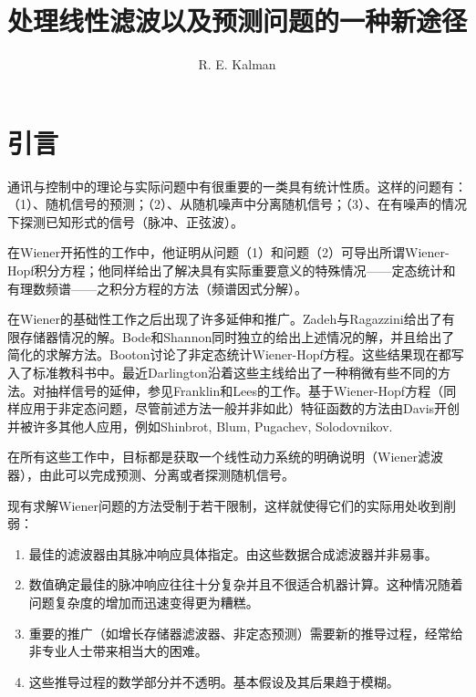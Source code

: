 \documentclass[UTF8,adobefonts]{ctexart}
\begin{document}
\title{处理线性滤波以及预测问题的一种新途径}
\author{R. E. Kalman}
\date{}
\maketitle
\section{引言}
通讯与控制中的理论与实际问题中有很重要的一类具有统计性质。这样的问题有：（1）、随机信号的预测；（2）、从随机噪声中分离随机信号；（3）、在有噪声的情况下探测已知形式的信号（脉冲、正弦波）。

在Wiener开拓性的工作中，他证明\cite{rf1}从问题（1）和问题（2）可导出所谓Wiener-Hopf积分方程；他同样给出了解决具有实际重要意义的特殊情况——定态统计和有理数频谱——之积分方程的方法（频谱因式分解）。

在Wiener的基础性工作之后出现了许多延伸和推广。Zadeh与Ragazzini给出了有限存储器情况的解\cite{rf2}。Bode和Shannon\cite{rf3}同时独立的给出上述情况的解，并且给出了简化的求解方法。Booton讨论了非定态统计Wiener-Hopf方程\cite{rf4}。这些结果现在都写入了标准教科书中\cite{rf5,rf6}。最近Darlington\cite{rf7}沿着这些主线给出了一种稍微有些不同的方法。对抽样信号的延伸，参见Franklin\cite{rf8}和Lees\cite{rf9}的工作。基于Wiener-Hopf方程（同样应用于非定态问题，尽管前述方法一般并非如此）特征函数的方法由Davis\cite{rf10}开创并被许多其他人应用，例如Shinbrot\cite{rf11}, Blum\cite{rf12}, Pugachev\cite{rf13}, Solodovnikov\cite{rf14}.

在所有这些工作中，目标都是获取一个线性动力系统的明确说明（Wiener滤波器），由此可以完成预测、分离或者探测随机信号。

现有求解Wiener问题的方法受制于若干限制，这样就使得它们的实际用处收到削弱：
\begin{enumerate}
\item 最佳的滤波器由其脉冲响应具体指定。由这些数据合成滤波器并非易事。
\item 数值确定最佳的脉冲响应往往十分复杂并且不很适合机器计算。这种情况随着问题复杂度的增加而迅速变得更为糟糕。
\item 重要的推广（如增长存储器滤波器、非定态预测）需要新的推导过程，经常给非专业人士带来相当大的困难。
\item 这些推导过程的数学部分并不透明。基本假设及其后果趋于模糊。
\end{enumerate}
\end{document}
